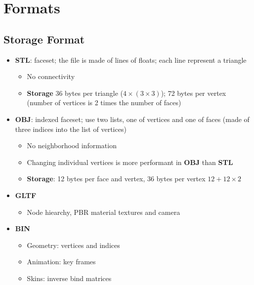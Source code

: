 \section{Formats}

\subsection{Storage Format}

  \begin{itemize}
    \item \textbf{STL}: faceset; the file is made of lines of floats; each line
    represent a triangle
    \begin{itemize}
      \item No connectivity
      \item \textbf{Storage} 36 bytes per triangle
      ($ 4 \times \left( 3 \times 3 \right) $); 72 bytes per vertex (number of
      vertices is 2 times the number of faces)
    \end{itemize}

    \item \textbf{OBJ}: indexed faceset; use two lists, one of vertices and
    one of faces (made of three indices into the list of vertices)
    \begin{itemize}
      \item No neighborhood information
      \item Changing individual vertices is more performant in \textbf{OBJ}
      than \textbf{STL}
      \item \textbf{Storage}: 12 bytes per face and vertex, 36 bytes per
      vertex $ 12 + 12 \times 2 $
    \end{itemize}

    \item \textbf{GLTF}
    \begin{itemize}
      \item Node hiearchy, PBR material textures and camera
    \end{itemize}

    \item \textbf{BIN}
    \begin{itemize}
      \item Geometry: vertices and indices
      \item Animation:  key frames
      \item Skins: inverse bind matrices
    \end{itemize}


\end{itemize}
